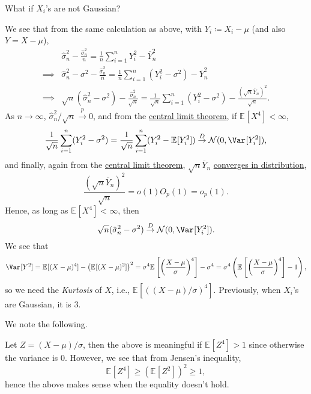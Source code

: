 \begin{problem*}
	What if \(X_i\)'s are not Gaussian?
\end{problem*}
\begin{answer}
	We see that from the same calculation as above, with \(Y_i \coloneqq X_i - \mu \) (and also \(Y = X - \mu \)),
	\[
		\begin{split}
			         & \hat{\sigma} _n^2 - \frac{\hat{\sigma} _n^2}{n} = \frac{1}{n} \sum_{i=1}^{n} Y_i^2 - \overline{Y} _n^2                                                                                    \\
			\implies & \hat{\sigma} _n^2 - \sigma ^2 - \frac{\hat{\sigma} _n^2}{n} = \frac{1}{n} \sum_{i=1}^{n} (Y_i^2 - \sigma ^2)- \overline{Y} _n^2                                                           \\
			\implies & \sqrt{n}(\hat{\sigma } _n^2 - \sigma ^2) - \frac{\hat{\sigma} _n^2}{\sqrt{n} } = \frac{1}{\sqrt{n} } \sum_{i=1}^{n} (Y_i^2 - \sigma ^2) - \frac{(\sqrt{n} \overline{Y} _n)^2}{\sqrt{n} }.
		\end{split}
	\]
	As \(n \to \infty \), \(\hat{\sigma} _n^2 / \sqrt{n} \overset{p}{\to } 0\), and from the \hyperref[thm:CLT]{central limit theorem}, if \(\mathbb{E}_{}[X^4] < \infty \),
	\[
		\frac{1}{\sqrt{n} } \sum_{i=1}^{n} (Y_i^2 - \sigma ^2)
		= \frac{1}{\sqrt{n} } \sum_{i=1}^{n} (Y_i^2 - \mathbb{E}_{}[Y_i^2] )
		\overset{D}{\to } \mathcal{N} (0, \Var_{}[Y_i^2] ),
	\]
	and finally, again from the \hyperref[thm:CLT]{central limit theorem}, \(\sqrt{n} \overline{Y} _n\) \hyperref[def:converge-in-distribution]{converges in distribution},
	\[
		\frac{(\sqrt{n} \overline{Y} _n) ^2}{\sqrt{n} }
		= o(1) O_p(1)
		= o_p(1).
	\]
	Hence, as long as \(\mathbb{E}_{}[X^4] < \infty \), then
	\[
		\sqrt{n} (\hat{\sigma} _n^2 - \sigma ^2)
		\overset{D}{\to } \mathcal{N} (0, \Var_{}[Y_i^2] ).
	\]
	We see that
	\[
		\Var_{}[Y^2]
		= \mathbb{E}_{}[(X - \mu )^4]  - \left( \mathbb{E}_{}[(X-\mu )^2] \right) ^2
		= \sigma ^4 \mathbb{E}_{}\left[\left( \frac{X-\mu }{\sigma } \right) ^4 \right] - \sigma ^4
		= \sigma ^4 \left( \mathbb{E}_{}\left[\left( \frac{X-\mu }{\sigma } \right) ^4 \right] - 1 \right),
	\]
	so we need the \emph{Kurtosis} of \(X\), i.e., \(\mathbb{E}_{}[( (X-\mu ) / \sigma )^4] \). Previously, when \(X_i\)'s are Gaussian, it is \(3\).
\end{answer}

We note the following.

\begin{note}
	Let \(Z = (X-\mu ) / \sigma \), then the above is meaningful if \(\mathbb{E}_{}[Z^4] > 1\) since otherwise the variance is \(0\). However, we see that from Jensen's inequality,
	\[
		\mathbb{E}_{}[Z^4] \geq \left( \mathbb{E}_{}[Z^2] \right) ^2 \geq 1,
	\]
	hence the above makes sense when the equality doesn't hold.
\end{note}

